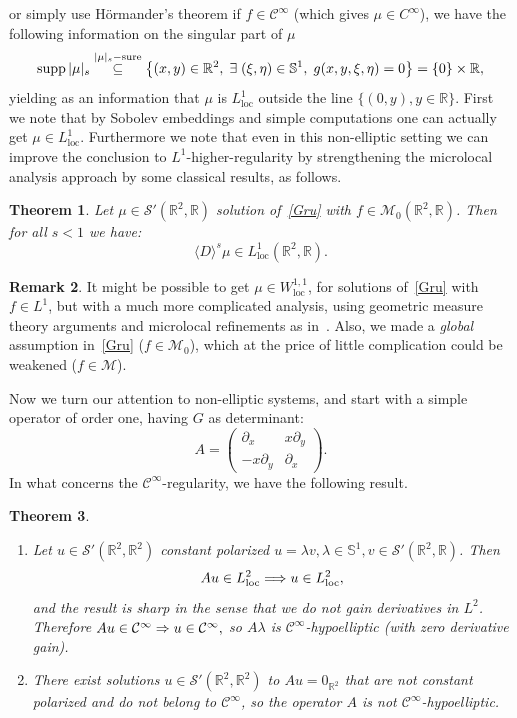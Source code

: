 \documentclass[10pt]{amsart}
\newtheorem{theo}{Theorem}[section]
\theoremstyle{definition}\newtheorem{defi}[theo]{Definition}\newtheorem{rema}[theo]{Remark}\newtheorem{exam}[theo]{Example}\newtheorem{exem}[theo]{Example}\newtheorem{nota}[theo]{Notation}
\DeclareMathOperator{\sure}{sure}
\DeclareMathOperator{\supp}{supp}
\DeclareMathOperator{\locc}{loc}
\newcommand{\bbR}{\mathbb{R}}
\newcommand{\bbS}{\mathbb{S}}
\newcommand{\clC}{\mathcal{C}}
\newcommand{\clS}{\mathcal{S}}
\newcommand{\clM}{\mathcal{M}}
\renewcommand*{\implies}{\mathchoice{\Longrightarrow}{\Rightarrow}{\Rightarrow}{\Rightarrow}}
\let\originalleft\left
\let\originalright\right
\renewcommand{\left}{\mathopen{}\mathclose\bgroup\originalleft}
\renewcommand{\right}{\aftergroup\egroup\originalright}
\newcommand*{\relabel}{\renewcommand{\labelenumi}{(\theenumi)}}
\newcommand*{\romanenumi}{\renewcommand*{\theenumi}{\roman{enumi}}\relabel}
\let\oldexists\exists
\renewcommand*{\exists}{\mathrel{\oldexists}}
\begin{document}
\pagebreak{}
or simply use H\"ormander's theorem if $f\in\clC^\infty$ (which gives $\mu\in C^\infty$), we have the following information on the singular part of $\mu$
\[
\supp |\mu|_s\overset{|\mu|_s-\sure}\subseteq 
\left\{(x,y)\in\bbR^2, \;\exists (\xi,\eta)\in\bbS^1, \; g(x,y,\xi,\eta)=0\right\}= \{0\}\times\bbR,
\]
yielding as an information that $\mu$ is $L^1_{\locc}$ outside the line $\{(0,y),y\in\bbR\}$. First we note that by Sobolev embeddings and simple computations one can actually get $ \mu\in L^1_{\locc}$. Furthermore we note that even in this non-elliptic setting we can improve the conclusion to $L^1$-higher-regularity by strengthening the microlocal analysis approach by some classical results, as follows.

\begin{theo}\label{th}
Let $\mu\in \clS'(\bbR^2,\bbR)$ solution of~\eqref{Gru} with $f\in\clM_0(\bbR^2,\bbR)$. Then for all $s<1$ we have:
\[
\langle D\rangle^{s}\mu\in L^1_{\locc}(\bbR^2,\bbR).
\]
\end{theo}
\begin{rema}
It might be possible to get $\mu\in W^{1,1}_{\locc}$, for solutions of~\eqref{Gru} with $f\in L^1$, but with a much more complicated analysis, using geometric measure theory arguments and microlocal refinements as in~\cite{BBWFL1}. Also, we made a \emph{global} assumption in~\eqref{Gru} ($f \in \clM_0$), which at the price of little complication could be weakened ($f\in \clM$).
\end{rema}

Now we turn our attention to non-elliptic systems, and start with a simple operator of order one, having $G$ as determinant:
\[
A=
\begin{pmatrix}
\partial_{x} & x\partial_{y}\\
-x\partial_{y} & \partial_{x}
\end{pmatrix}.
\]
In what concerns the $\clC^\infty$-regularity, we have the following result.

\begin{theo}\leavevmode
\label{thvectcinfty}
\begin{enumerate}\romanenumi
\item\label{theo1.3.1} Let $u\in \clS'(\bbR^2,\bbR^2)$ constant polarized $u=\lambda v,\lambda\in \bbS^1, v\in \clS'(\bbR^2,\bbR)$. Then
\[
Au\in L^2_{\locc} \implies u\in L^2_{\locc},
\]
and the result is sharp in the sense that we do not gain derivatives in $L^2$. Therefore $Au\in\clC^\infty \implies u\in\clC^\infty,$ so $A\lambda$ is $\clC^\infty$-hypoelliptic (with zero derivative gain).


\item\label{theo1.3.2} There exist solutions $u\in \clS'(\bbR^2,\bbR^2)$ to $Au=0_{\bbR^2}$ that are not constant polarized and do not belong to $\clC^\infty$, so the operator $A$ is not $\clC^\infty$-hypoelliptic.
\end{enumerate}
\end{theo}
\end{document}
